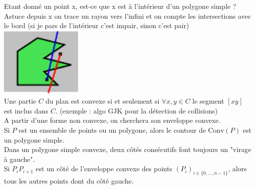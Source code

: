  Etant donné un point x, est-ce que x est à l'intérieur d'un polygone simple ? Astuce depuis x on trace un rayon vers l'infini et on compte les intersections avec le bord (si je pars de l'intérieur c'est impair, sinon c'est pair) \\
\includegraphics[width=150px]{Images/fig12.pdf} \\

 Une partie $C$ du plan est convexe si et seulement si $\forall x,y \in C$ le segment $[xy]$ est inclus dans $C$. (exemple : algo GJK pour la détection de collisions)\\

 A partir d'une forme non convexe, on cherchera son enveloppe convexe. \\

 Si $P$ est un ensemble de points ou un polygone, alors le contour de $\mathrm{Conv}(P)$ est un polygone simple. \\

 Dans un polygone simple convexe, deux côtés consécutifs font toujours un "virage à gauche". \\

 Si $P_iP_{i+1}$ est un côté de l'enveloppe convexe des points $(P_i)_{i\in\{0,\ldots,n-1\}}$, alors tous les autres points dont du côté gauche.\\

